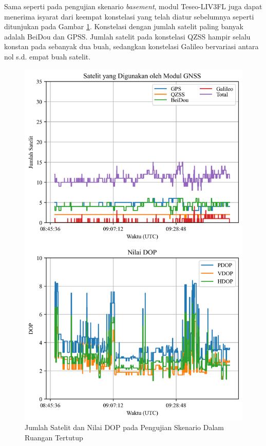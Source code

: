 Sama seperti pada pengujian skenario \textit{basement}, modul Teseo-LIV3FL juga dapat menerima isyarat dari keempat konstelasi yang telah diatur sebelumnya seperti ditunjukan pada Gambar \ref{Fig: indoor-sats_dop}. Konstelasi dengan jumlah satelit paling banyak adalah BeiDou dan GPSS. Jumlah satelit pada konstelasi QZSS hampir selalu konstan pada sebanyak dua buah, sedangkan konstelasi Galileo bervariasi antara nol s.d. empat buah satelit.

\begin{figure}[H]
	\centering
	\captionsetup{justification=centering}
	\includegraphics[width=12cm]{contents/chapter-4/2-skenario-indoor/sats_dop.png}
	\caption{Jumlah Satelit dan Nilai DOP pada Pengujian Skenario Dalam Ruangan Tertutup}
	\label{Fig: indoor-sats_dop}
\end{figure}

